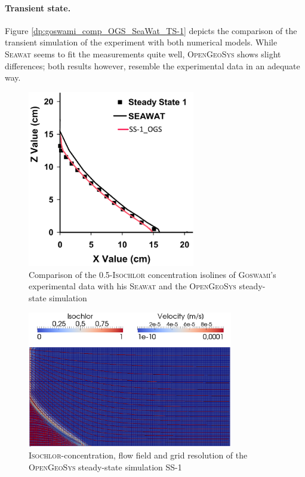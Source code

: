 \paragraph*{Transient state.} 
Figure \ref{dp:goswami_comp_OGS_SeaWat_TS-1} depicts the comparison of the transient simulation of the experiment with both numerical models. While \textsc{Seawat} seems to fit the measurements quite well, \textsc{OpenGeoSys} shows slight differences; both results however, resemble the experimental data in an adequate way. 

\begin{figure}
 \centering 
 \includegraphics[width=0.65\textwidth] {PART_III/DDF/figures/goswami_comp_exp_OGS_SeaWat_SS-1.eps}	%
 \caption{Comparison of the 0.5-\textsc{Isochlor} concentration isolines of \textsc{Goswami}'s experimental data with his \textsc{Seawat} and the \textsc{OpenGeoSys} steady-state simulation}
 \label{dp:goswami_comp_exp_SeaWat_OGS}
\end{figure}

\begin{figure}
 \centering 
 \includegraphics[width=0.8\textwidth] {PART_III/DDF/figures/goswami_flow_results.eps}
 \caption{\textsc{Isochlor}-concentration, flow field and grid resolution of the \textsc{OpenGeoSys} steady-state simulation SS-1}
 \label{dp:goswami_ss-1_ogs}
\end{figure}



